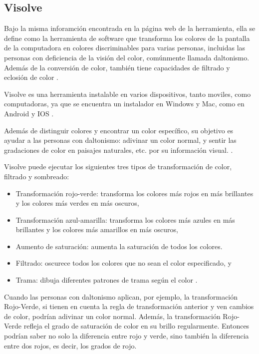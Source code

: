 \documentclass[10pt]{article}
\begin{document}
\subsection{Visolve}

Bajo la misma inforamción encontrada en la página web de la herramienta, ella se define como la herramienta de software que transforma los colores de la pantalla de la computadora en colores discriminables para varias personas, incluidas las personas con deficiencia de la visión del color, comúnmente llamada daltonismo. Además de la conversión de color, también tiene capacidades de filtrado y eclosión de color \cite{IEEEreferencias:Ref20}.

\setlength{\parskip}{2mm}

Visolve es una herramienta instalable en varios dispositivos, tanto moviles, como computadoras, ya que se encuentra un instalador en Windows y Mac, como en Android y IOS \cite{IEEEreferencias:Ref20}.

\setlength{\parskip}{2mm}

Además de distinguir colores y encontrar un color específico, su objetivo es ayudar a las personas con daltonismo: adivinar un color normal, y sentir las gradaciones de color en paisajes naturales, etc. por su información visual.
\cite{IEEEreferencias:Ref20}.

\setlength{\parskip}{2mm}

Visolve puede ejecutar los siguientes tres tipos de transformación de color, filtrado y sombreado:

\begin{itemize}
    \item Transformación rojo-verde: transforma los colores más rojos en más brillantes y los colores más verdes en más oscuros,
    \item Transformación azul-amarilla: transforma los colores más azules en más brillantes y los colores más amarillos en más oscuros,
    \item Aumento de saturación: aumenta la saturación de todos los colores.
    \item Filtrado: oscurece todos los colores que no sean el color especificado, y
    \item Trama: dibuja diferentes patrones de trama según el color
\cite{IEEEreferencias:Ref20}.
\end{itemize}

Cuando las personas con daltonismo aplican, por ejemplo, la transformación Rojo-Verde, si tienen en cuenta la regla de transformación anterior y ven cambios de color, podrían adivinar un color normal. Además, la transformación Rojo-Verde refleja el grado de saturación de color en su brillo regularmente. Entonces podrían saber no solo la diferencia entre rojo y verde, sino también la diferencia entre dos rojos, es decir, los grados de rojo\cite{IEEEreferencias:Ref20}.
\end{document}
